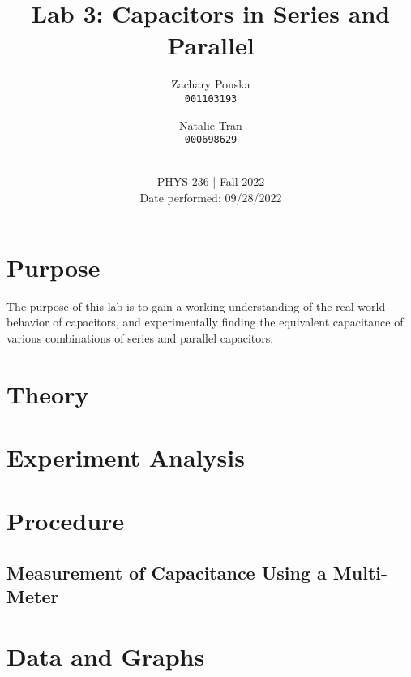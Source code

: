 \documentclass[titlepage]{article}
\begin{document}
\title{\textbf{Lab 3: Capacitors in Series and Parallel}}
\author{
    Zachary Pouska\\
    \texttt{001103193}\\
    \and
    Natalie Tran \\ 
    \texttt{000698629}\\ \\
} 

\date{PHYS 236 | Fall 2022\\
Date performed: 09/28/2022}


	\maketitle



	\section{Purpose}
    The purpose of this lab is to gain a working understanding of the real-world behavior of capacitors, and experimentally finding the equivalent capacitance of various combinations of series and parallel capacitors.

	\section{Theory}	




	\section{Experiment Analysis}
    



	\section{Procedure}

        \subsection{Measurement of Capacitance Using a Multi-Meter}



        \subsection{}




	\section{Data and Graphs}
\end{document}
